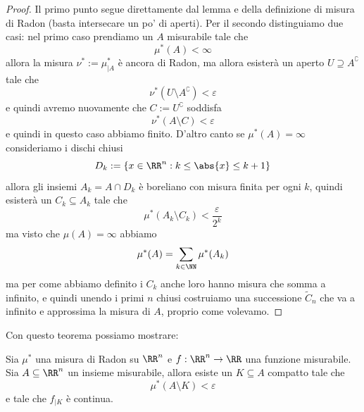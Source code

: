\documentclass[11pt]{scrartcl}
\begin{document}
	\begin{proof}
		Il primo punto segue direttamente dal lemma e della definizione di misura di Radon (basta intersecare un po' di aperti). Per il secondo distinguiamo due casi: nel primo caso prendiamo un $A$ misurabile tale che 
		$$\mu^*(A)<\infty$$
		allora la misura $\nu^*:=\mu^*_{\mid A}$ è ancora di Radon, ma allora esisterà un aperto $U\supseteq A^\complement$ tale che
		$$\nu^*(U\setminus A^\complement)<\varepsilon$$
		e quindi avremo nuovamente che $C:=U^\complement$ soddisfa
		$$\nu^*(A\setminus C)<\varepsilon$$
		e quindi in questo caso abbiamo finito. D'altro canto se $\mu^*(A)=\infty$ consideriamo i dischi chiusi
		$$D_k:=\left\{x\in \RR^n:k\le \abs{x}\le k+1\right\}$$
		allora gli insiemi $A_k= A\cap D_k$ è boreliano con misura finita per ogni $k$, quindi esisterà un $C_k\subseteq A_k$ tale che
		$$\mu^*(A_k\setminus C_k)<\frac{\varepsilon}{2^k}$$
		ma visto che $\mu(A)=\infty$ abbiamo
		$$\mu^*(A)=\sum_{k\in\NN}\mu^*(A_k)$$
		ma per come abbiamo definito i $C_k$ anche loro hanno misura che somma a infinito, e quindi unendo i primi $n$ chiusi costruiamo una successione $\tilde{C}_n$ che va a infinito e approssima la misura di $A$, proprio come volevamo.
	\end{proof}
	Con questo teorema possiamo mostrare:
	\begin{theorem}[Lusin]
		Sia $\mu^*$ una misura di Radon su $\RR^n$ e $f:\RR^n\to\RR$ una funzione misurabile. Sia $A\subseteq\RR^n$ un insieme misurabile, allora esiste un $K\subseteq A$ compatto tale che 
		$$\mu^*(A\setminus K)<\varepsilon$$
		e tale che $f_{\mid K}$ è continua.
	\end{theorem}
\end{document}
